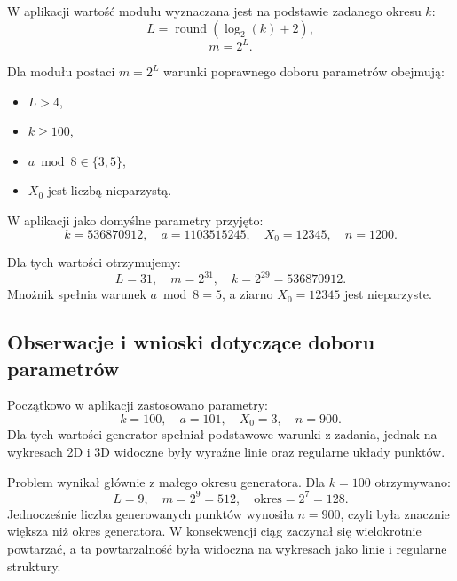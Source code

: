\documentclass[12pt,a4paper]{article}
\begin{document}
W aplikacji wartość modułu wyznaczana jest na podstawie zadanego okresu $k$:
\begin{equation}
  L = \operatorname{round}(\log_2(k) + 2),
\end{equation}
\begin{equation}
  m = 2^L.
\end{equation}

Dla modułu postaci $m = 2^L$ warunki poprawnego doboru parametrów obejmują:
\begin{itemize}
  \item $L > 4$,
  \item $k \geq 100$,
  \item $a \bmod 8 \in \{3,5\}$,
  \item $X_0$ jest liczbą nieparzystą.
\end{itemize}

W aplikacji jako domyślne parametry przyjęto:
\begin{equation}
  k = 536870912,\quad a = 1103515245,\quad X_0 = 12345,\quad n = 1200.
\end{equation}

Dla tych wartości otrzymujemy:
\begin{equation}
  L = 31,\quad m = 2^{31},\quad k = 2^{29} = 536870912.
\end{equation}
Mnożnik spełnia warunek $a \bmod 8 = 5$, a ziarno $X_0 = 12345$ jest nieparzyste.

\subsection{Obserwacje i wnioski dotyczące doboru parametrów}

Początkowo w aplikacji zastosowano parametry:
\begin{equation}
  k = 100,\quad a = 101,\quad X_0 = 3,\quad n = 900.
\end{equation}
Dla tych wartości generator spełniał podstawowe warunki z zadania, jednak na wykresach 2D i 3D widoczne były wyraźne linie oraz regularne układy punktów.

Problem wynikał głównie z małego okresu generatora. Dla $k = 100$ otrzymywano:
\begin{equation}
  L = 9,\quad m = 2^9 = 512,\quad \text{okres} = 2^7 = 128.
\end{equation}
Jednocześnie liczba generowanych punktów wynosiła $n = 900$, czyli była znacznie większa niż okres generatora. W konsekwencji ciąg zaczynał się wielokrotnie powtarzać, a ta powtarzalność była widoczna na wykresach jako linie i regularne struktury.
\end{document}
